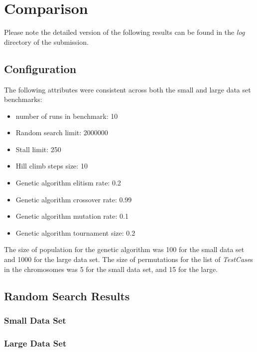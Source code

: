 \documentclass[11pt, a4paper]{article}
\begin{document}
\section{Comparison}
Please note the detailed version of the following results can be found in the
\emph{log} directory of the submission.

\subsection{Configuration} %
\label{sub:configuration}
The following attributes were consistent across both the small and large data
set benchmarks:
\begin{itemize}
	\item number of runs in benchmark: 10
	\item Random search limit: 2000000
	\item Stall limit: 250
	\item Hill climb steps size: 10
	\item Genetic algorithm elitism rate: 0.2
	\item Genetic algorithm crossover rate: 0.99
	\item Genetic algorithm mutation rate: 0.1
	\item Genetic algorithm tournament size: 0.2
\end{itemize}

The size of population for the genetic algorithm was 100 for the small data set
and 1000 for the large data set. The size of permutations for the list of
\emph{TestCase}s in the chromosomes was 5 for the small data set, and 15 for the
large.

\subsection{Random Search Results}
\subsubsection{Small Data Set} %
\label{ssub:random_small_data_set}
 

\subsubsection{Large Data Set} %
\label{ssub:random_large_data_set}
 
\end{document}
